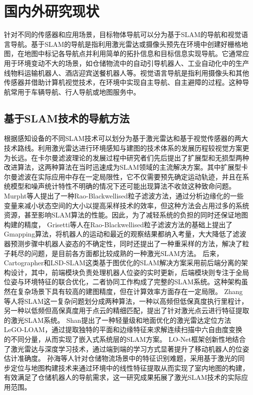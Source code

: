 \section{国内外研究现状}
    针对不同的传感器和应用场景，目标物体导航可以分为基于SLAM的导航和视觉语言导航。基于SLAM的导航是指利用激光雷达或摄像头预先在环境中创建好栅格地图，在地图中标记各导航点并利用简单的拓扑信息和目标信息实现导航。它通常应用于环境变动不大的场景，如仓储物流中的自动引导机器人、工业自动化中的生产线物料运输机器人、酒店迎宾送餐机器人等。视觉语言导航是指利用摄像头和其他传感器并借助计算机视觉技术，在环境中实现自主导航、自主避障的过程。这种导航常用于车辆导航、行人导航或地图服务中。

\subsection{基于SLAM技术的导航方法}
	
	根据感知设备的不同SLAM技术可以划分为基于激光雷达和基于视觉传感器的两大技术路线。利用激光雷达进行环境感知与建图的技术体系的发展历程较视觉方案更为长远。在卡尔曼滤波理论的发展过程中研究者们先后提出了扩展型和无损型两种改进算法，这两种算法在当时迅速成为SLAM领域的主流解决方案。其中扩展型卡尔曼滤波在实际应用中存在一定局限性，它不仅需要预先确定运动轨迹，并且在系统模型和噪声统计特性不明确的情况下还可能出现算法不收敛这种致命问题。
	Murpht\cite{murphy2001rao}等人提出了一种Rao-Blackwellised粒子滤波方法，通过分析边缘化的一些变量来减小状态空间的大小以提高采样技术的效率，但这种方法会占用过多的系统资源，甚至影响SLAM算法的性能。因此，为了减轻系统的负担的同时还保证地图构建的精度，
	Grisetti\cite{grisetti2005improving, grisetti2007improved}等人在Rao-Blackwellised粒子滤波方法的基础上提出了Gmapping算法，将机器人的运动和最近的观察结果都纳入考量，大大降低了滤波器预测步骤中机器人姿态的不确定性，同时还提出了一种重采样的方法，解决了粒子耗尽的问题，是目前各方面都比较成熟的一种激光SLAM方法。
	后来，Cartographer\cite{hess2016real}和LSD-SLAM\cite{engel2014lsd}这类基于图优化的SLAM解决方案采用前后端分离的架构设计，其中，前端模块负责处理机器人位姿的实时更新，后端模块则专注于全局位姿与环境特征的联合优化，二者协同工作构成了完整的SLAM系统。这种架构虽然在复杂场景下具有较高的建图精度，但在计算效率方面存在一定局限。
	Zhang\cite{zhang2017low}等人将SLAM这一复杂问题划分成两种算法，一种以高频但低保真度执行里程计，另一种以低频但高保真度用于点云的精细匹配，提出了针对激光点云进行特征提取的激光SLAM系统。
	Shan\cite{shan2018lego}提出了一种轻量级和地面优化的激光雷达定位方法LeGO-LOAM，通过提取独特的平面和边缘特征来求解连续扫描中六自由度变换的不同分量，从而实现了嵌入式系统层的SLAM方案。
	LO-Net\cite{li2019net}框架创新性地结合了激光雷达与深度学习技术，通过端到端的学习方式显著提升了移动机器人的位姿估计准确度。
	孙海\cite{孙海2017激光测距在仓储搬运机器人运动中的应用}等人针对仓储物流场景中的特征识别难题，采用基于激光的同步定位与地图构建技术来通过环境中的线性特征提取从而实现了室内地图的构建，有效满足了仓储机器人的导航需求，这一研究成果拓展了激光SLAM技术的实际应用范围。

